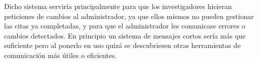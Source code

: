 \begin{itemize}
  Dicho sistema serviría principalmente para que los investigadores hicieran peticiones de cambios al administrador, ya que ellos mismos no pueden gestionar las citas ya completadas, y para que el administrador les comunicase errores o cambios detectados. En principio un sistema de mensajes cortos sería más que suficiente pero al ponerlo en uso quizá se descubriesen otras herramientas de comunicación más útiles o eficientes. \\
  

\end{itemize}